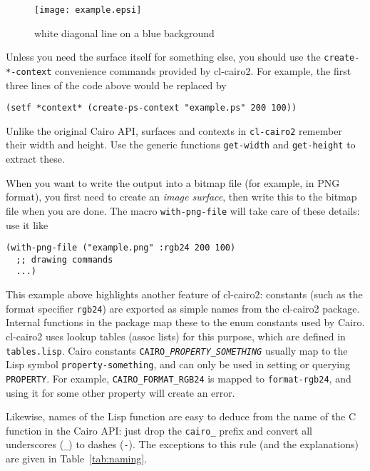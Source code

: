 \documentclass[12pt,letterpaper,dvipdfm]{article}
\begin{document}


\begin{figure}[htbp]
  \centering
  \texttt{[image: example.epsi]}
  \caption{white diagonal line on a blue background}
  \label{fig:example}
\end{figure}

Unless you need the surface itself for something else, you should use
the \lstinline!create-*-context! convenience commands provided by
cl-cairo2.  For example, the first three lines of the code above would
be replaced by
\begin{lstlisting}
(setf *context* (create-ps-context "example.ps" 200 100))
\end{lstlisting}
Unlike the original Cairo API, surfaces and contexts in
\lstinline!cl-cairo2! remember their width and height.  Use the
generic functions \lstinline!get-width! and \lstinline!get-height! to
extract these.

When you want to write the output into a bitmap file (for example, in
PNG format), you first need to create an \emph{image surface}, then
write this to the bitmap file when you are done.  The macro
\lstinline!with-png-file! will take care of these details: use it like
\begin{lstlisting}
(with-png-file ("example.png" :rgb24 200 100)
  ;; drawing commands
  ...)
\end{lstlisting}

This example above highlights another feature of cl-cairo2: constants
(such as the format specifier \lstinline!rgb24!) are exported as
simple names from the cl-cairo2 package.  Internal functions in the
package map these to the enum constants used by Cairo.  cl-cairo2 uses
lookup tables (assoc lists) for this purpose, which are defined in
\verb!tables.lisp!.  Cairo constants
\texttt{CAIRO\_\textsl{PROPERTY}\_\textsl{SOMETHING}} usually map to
the Lisp symbol \lstinline!property-something!, and can only be used
in setting or querying \texttt{PROPERTY}.  For example,
\verb!CAIRO_FORMAT_RGB24!  is mapped to \lstinline!format-rgb24!, and
using it for some other property will create an error.

Likewise, names of the Lisp function are easy to deduce from the name
of the C function in the Cairo API: just drop the \verb!cairo_! prefix
and convert all underscores (\verb!_!) to dashes (\lstinline!-!).  The
exceptions to this rule (and the explanations) are given in
Table~\ref{tab:naming}.
\end{document}
